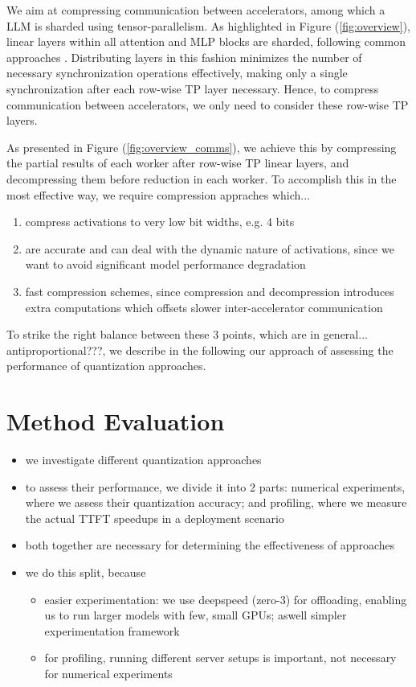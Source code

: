We aim at compressing communication between accelerators, among which a LLM is sharded using tensor-parallelism. As highlighted in Figure (\ref{fig:overview}), linear layers within all attention and MLP blocks are sharded, following common approaches \parencite{megatron, reducingactivationrecomputation}. Distributing layers in this fashion minimizes the number of necessary synchronization operations effectively, making only a single synchronization after each row-wise TP layer necessary. Hence, to compress communication between accelerators, we only need to consider these row-wise TP layers. 

As presented in Figure (\ref{fig:overview_comms}), we achieve this by compressing the partial results of each worker after row-wise TP linear layers, and decompressing them before reduction in each worker. 
To accomplish this in the most effective way, we require compression appraches which...
\begin{enumerate}
    \item compress activations to very low bit widths, e.g. 4 bits
    \item are accurate and can deal with the dynamic nature of activations, since we want to avoid significant model performance degradation
    \item fast compression schemes, since compression and decompression  introduces extra computations which offsets slower inter-accelerator communication
\end{enumerate}
To strike the right balance between these 3 points, which are in general... antiproportional???, we describe in the following our approach of assessing the performance of quantization approaches.

\section{Method Evaluation}
\begin{itemize}
    \item we investigate different quantization approaches
    \item to assess their performance, we divide it into 2 parts: numerical experiments, where we assess their quantization accuracy; and profiling, where we measure the actual TTFT speedups in a deployment scenario
    \item both together are necessary for determining the effectiveness of approaches
    \item we do this split, because
        \begin{itemize}
            \item easier experimentation: we use deepspeed (zero-3) for offloading, enabling us to run larger models with few, small GPUs; aswell simpler experimentation framework
            \item for profiling, running different server setups is important, not necessary for numerical experiments
        \end{itemize}
\end{itemize}

